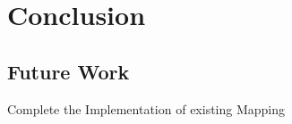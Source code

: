 \chapter{Conclusion}
\label{chap:conclusion}

\section{Future Work}

Complete the Implementation of existing Mapping



 
